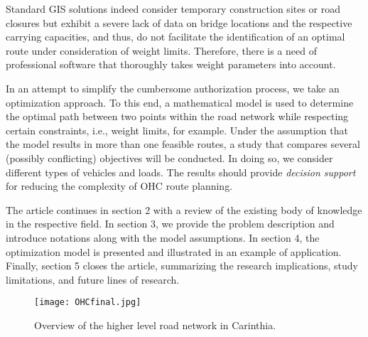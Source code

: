 Standard GIS solutions indeed consider temporary construction sites or road closures but exhibit a severe lack of data on bridge locations and the respective carrying capacities, and thus, do not facilitate the identification of an optimal route under consideration of weight limits.
Therefore, there is a need of professional software that thoroughly takes weight parameters into account.
\par In an attempt to simplify the cumbersome authorization process, we take an optimization approach.
To this end, a mathematical model is used to determine the optimal path between two points within the road network while respecting certain constraints, i.e., weight limits, for example.
Under the assumption that the model results in more than one feasible routes, a study that compares several (possibly conflicting) objectives will be conducted.
In doing so, we consider different types of vehicles and loads. The results should provide \textit{decision support} for reducing the complexity of OHC route planning. 
\par
The article continues in section 2 with a review of the existing body of knowledge in the respective field.
In section 3, we provide the problem description and introduce notations along with the model assumptions. In section 4, the optimization model is presented and illustrated in an example of application.
Finally, section 5 closes the article, summarizing the research implications, study limitations, and future lines of research.



\begin{figure}[!ht]
  \centering
  \texttt{[image: OHCfinal.jpg]}
  \caption{Overview of the higher level road network in Carinthia.}
  \label{fig:higher level}
\end{figure}
